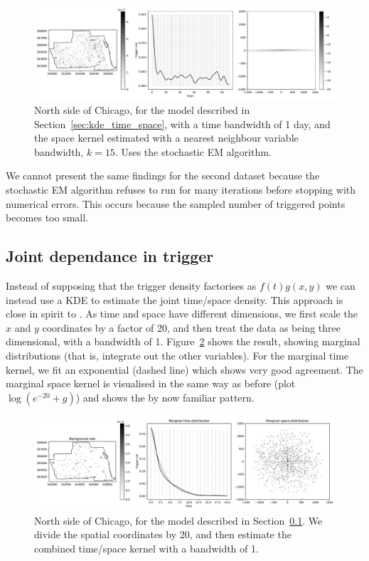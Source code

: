 \documentclass[twoside,a4paper]{article}
\theoremstyle{plain}
\theoremstyle{definition}
\begin{document}
\begin{figure}
  \includegraphics[width=\textwidth]{../notebooks/grid_kde_knn_sem_1.pdf}
  \caption{North side of Chicago, for the model described in Section~\ref{sec:kde_time_space},
  with a time bandwidth of 1 day, and the space kernel estimated with a nearest neighbour variable
  bandwidth, $k=15$.  Uses the stochastic EM algorithm.}
  \label{fig:grid_kde_5}
\end{figure}

We cannot present the same findings for the second dataset because the stochastic EM algorithm
refuses to run for many iterations before stopping with numerical errors.  This occurs because
the sampled number of triggered points becomes too small.




\subsection{Joint dependance in trigger}\label{sec:joint_grid}

Instead of supposing that the trigger density factorises as $f(t)g(x,y)$ we can instead use a KDE
to estimate the joint time/space density.  This approach is close in spirit to \cite{sepp}.
As time and space have different dimensions, we first scale the $x$ and $y$ coordinates by a factor
of 20, and then treat the data as being three dimensional, with a bandwidth of 1.
Figure~\ref{fig:full_kde_1} shows the result, showing marginal distributions (that is, integrate
out the other variables).  For the marginal time kernel, we fit an exponential (dashed line)
which shows very good agreement.  The marginal space kernel is visualised in the same way as
before (plot $\log(e^{-20}+g)$) and shows the by now familiar pattern.

\begin{figure}
  \includegraphics[width=\textwidth]{../notebooks/full_kde_1.pdf}
  \caption{North side of Chicago, for the model described in Section~\ref{sec:joint_grid}.
  We divide the spatial coordinates by 20, and then estimate the combined time/space kernel
  with a bandwidth of 1.}
  \label{fig:full_kde_1}
\end{figure}
\end{document}
